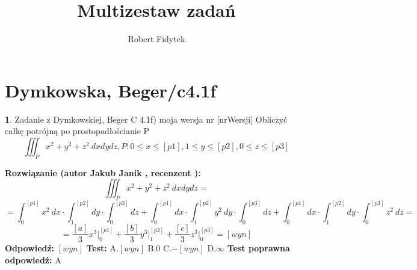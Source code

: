 \documentclass[12pt, a4paper]{article}
\title{Multizestaw zadań}
\author{Robert Fidytek}
\date{}
\theoremstyle{definition} %
\newtheorem{zad}{}
\newcommand{\kategoria}[1]{\section{#1}} %
\newcommand{\zadStart}[1]{\begin{zad}#1\newline} %
\newcommand{\zadStop}{\end{zad}}   %
\newcommand{\rozwStart}[2]{\noindent \textbf{Rozwiązanie (autor #1 , recenzent #2): }\newline} %
\newcommand{\rozwStop}{\newline}                                            %
\newcommand{\odpStart}{\noindent \textbf{Odpowiedź:}\newline}    %
\newcommand{\odpStop}{\newline}                                             %
\newcommand{\testStart}{\noindent \textbf{Test:}\newline} %
\newcommand{\testStop}{\newline} %
\newcommand{\kluczStart}{\noindent \textbf{Test poprawna odpowiedź:}\newline} %
\newcommand{\kluczStop}{\newline} %
\begin{document}
\maketitle


\kategoria{Dymkowska, Beger/c4.1f}
\zadStart{Zadanie z Dymkowskiej, Beger C 4.1f) moja wersja nr [nrWersji]}
Obliczyć całkę potrójną po prostopadłościanie P $$\iiint_P x^2+y^2+z^2\ dxdydz, P: 0 \leq x \leq [p1], 1 \leq y \leq [p2], 0 \leq z \leq [p3]$$
\zadStop
\rozwStart{Jakub Janik}{}
$$\iiint_P x^2+y^2+z^2\ dxdydz=$$
$$=\int_{0}^{[p1]}x^2\ dx\cdot\int_{1}^{[p2]}dy\cdot\int_{0}^{[p3]}dz+\int_{0}^{[p1]}dx\cdot\int_{1}^{[p2]}y^2\ dy\cdot\int_{0}^{[p3]}dz+\int_{0}^{[p1]}dx\cdot\int_{1}^{[p2]}dy\cdot\int_{0}^{[p3]}z^2\ dz=$$
$$=\frac{[a]}{3}x^3\Big|_0^{[p1]}+\frac{[b]}{3}y^3\Big|_1^{[p2]}+\frac{[c]}{3}z^3\Big|_0^{[p3]}=[wyn]$$
\rozwStop
\odpStart
$[wyn]$
\odpStop
\testStart
A.$[wyn]$
B.$0$
C.$-[wyn]$
D.$\infty$
\testStop
\kluczStart
A
\kluczStop
\end{document}

